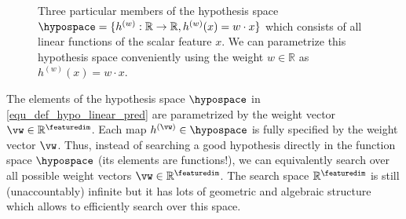 \documentclass[12pt]{report}
\begin{document}

\begin{figure}[htbp]
\begin{center}
     \vspace*{-4mm}
\end{center}
\caption{Three particular members of the hypothesis space 
	$\hypospace =\{ h^{(w)}: \mathbb{R} \rightarrow \mathbb{R}, h^{(w)}(x) = w \cdot x \}$ 
which consists of all linear functions of the scalar feature $x$. We can parametrize 
this hypothesis space conveniently using the weight $w\in \mathbb{R}$ as $h^{(w)}(x) = w \cdot x$.}
\label{scalar_lin_space}
\end{figure}

The elements of the hypothesis space $\hypospace$ in \eqref{equ_def_hypo_linear_pred} are  
parametrized by the weight vector $\vw \in \mathbb{R}^{\featuredim}$. Each map $h^{(\vw)} \in \hypospace$ 
is fully specified by the weight vector $\vw$. Thus, instead of searching a good hypothesis directly 
in the function space $\hypospace$ (its elements are functions!), we can equivalently search over 
all possible weight vectors $\vw \in \mathbb{R}^{\featuredim}$. The search space $\mathbb{R}^{\featuredim}$ 
is still (unaccountably) infinite but it has lots of geometric and algebraic structure which allows to 
efficiently search over this space. 
\end{document}
